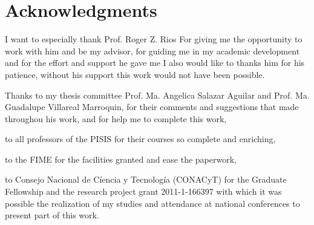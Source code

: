 
\chapter{Acknowledgments}

I want to especially thank
Prof. Roger Z. Rios
For giving me the opportunity to work with him
and be my advisor,
for guiding me in my academic development
and for the effort and support he gave me
I also would like to thanks him
for his patience,
without his support
this work would not have been possible. 

Thanks to my thesis committee
Prof. Ma. Angelica Salazar Aguilar
and Prof. Ma. Guadalupe Villareal Marroquin,
for their comments and suggestions
that made throughou his work,
and for help me
to complete this work,

to all professors of the PISIS
for their courses so complete and enriching,

to the FIME
for the facilities granted
and ease the paperwork,

to Consejo Nacional de Cíencia y Tecnología (CONACyT)
for the Graduate Fellowship
and the research project grant 2011-1-166397
with which it was possible the realization of my studies
and attendance at national conferences
to present part of this work.
